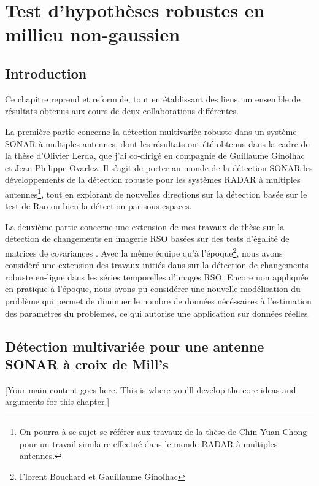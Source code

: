 \chapter{Test d'hypothèses robustes en millieu non-gaussien}
\label{ch:robust-detection}

\section{Introduction}
\label{sec:detection-introduction}


Ce chapitre reprend et reformule, tout en établissant des liens, un ensemble de résultats obtenus aux cours de deux collaborations différentes. 

La première partie concerne la détection multivariée robuste dans un système  SONAR à multiples antennes, dont les résultats ont été obtenus dans la cadre de la thèse d'Olivier Lerda, que j'ai co-dirigé en compagnie de Guillaume Ginolhac et Jean-Philippe Ovarlez. Il s'agit de porter au monde de la détection SONAR les développements de la détection robuste pour les systèmes RADAR à multiples antennes\footnote{On pourra à se sujet se référer aux travaux de la thèse de Chin Yuan Chong \cite{chong:tel-00772006} pour un travail similaire effectué dans le monde RADAR à multiples antennes.}, tout en explorant de nouvelles directions sur la détection basée sur le test de Rao ou bien la détection par sous-espaces.


La deuxième partie concerne une extension de mes travaux de thèse sur la détection de changements en imagerie RSO basées sur des tests d'égalité de matrices de covariances \cite{Mian_2019}. Avec la même équipe qu'à l'époque\footnote{Florent Bouchard et Gauillaume Ginolhac}, nous avons considéré une extension des travaux initiés dans \cite{Bouchard_2020} sur la détection de changements robuste en-ligne dans les séries temporelles d'images RSO. Encore non appliquée en pratique à l'époque, nous avons pu considérer une nouvelle modélisation du problème qui permet de diminuer le nombre de données nécéssaires à l'estimation des paramètres du problèmes, ce qui autorise une application sur données réelles.


\section{Détection multivariée pour une antenne SONAR à croix de Mill's}
\label{sec:detection-mills-antenna}


[Your main content goes here. This is where you'll develop the core ideas and arguments for this chapter.]

